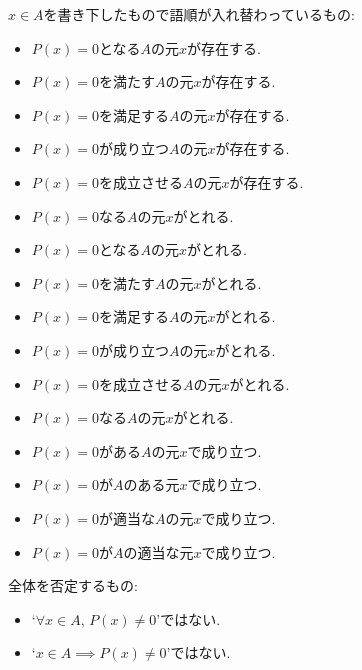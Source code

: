 \documentclass[a4paper,12pt,draft]{amsart}
\begin{document}
$x\in A$を書き下したもので語順が入れ替わっているもの:
\begin{itemize}
\item $P(x)=0$となる$A$の元$x$が存在する.
\item $P(x)=0$を満たす$A$の元$x$が存在する.
\item $P(x)=0$を満足する$A$の元$x$が存在する.
\item $P(x)=0$が成り立つ$A$の元$x$が存在する.
\item $P(x)=0$を成立させる$A$の元$x$が存在する.
\item $P(x)=0$なる$A$の元$x$がとれる.
\item $P(x)=0$となる$A$の元$x$がとれる.
\item $P(x)=0$を満たす$A$の元$x$がとれる.
\item $P(x)=0$を満足する$A$の元$x$がとれる.
\item $P(x)=0$が成り立つ$A$の元$x$がとれる.
\item $P(x)=0$を成立させる$A$の元$x$がとれる.
\item $P(x)=0$なる$A$の元$x$がとれる.
\item $P(x)=0$がある$A$の元$x$で成り立つ.
\item $P(x)=0$が$A$のある元$x$で成り立つ.
\item $P(x)=0$が適当な$A$の元$x$で成り立つ.
\item $P(x)=0$が$A$の適当な元$x$で成り立つ.
\end{itemize}
全体を否定するもの:
\begin{itemize}
\item `$\forall x \in A$, $P(x)\neq 0$'ではない.
\item `$x \in A\implies P(x)\neq 0$'ではない.
\end{itemize}
\end{document}
